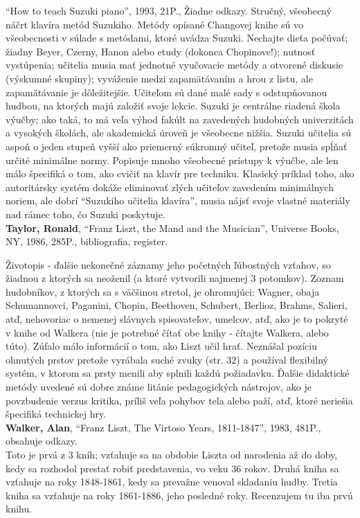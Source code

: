 “How to teach Suzuki piano”, 1993, 21P., Žiadne odkazy. Stručný, všeobecný náčrt klavíra metód Suzukiho. Metódy opísané Changovej knihe sú vo všeobecnosti v súlade s metódami, ktoré uvádza Suzuki. Nechajte dieťa počúvať; žiadny Beyer, Czerny, Hanon alebo etudy (dokonca Chopinove!); nutnosť vystúpenia; učitelia musia mať jednotné vyučovacie metódy a otvorené diskusie (výskumné skupiny); vyváženie medzi zapamätávaním a hrou z listu, ale zapamätávanie je dôležitejšie. Učiteľom sú dané malé sady s odstupňovanou hudbou, na ktorých majú založiť svoje lekcie. Suzuki je centrálne riadená škola výučby; ako taká, to má veľa výhod fakúlt na zavedených hudobných univerzitách a vysokých školách, ale akademická úroveň je všeobecne nižšia. Suzuki učitelia sú aspoň o jeden stupeň vyšší ako priemerný súkromný učiteľ, pretože musia spĺňať určité minimálne normy. Popisuje mnoho všeobecné prístupy k výučbe, ale len málo špecifiká o tom, ako cvičiť na klavír pre techniku. Klasický príklad toho, ako autoritársky systém dokáže eliminovať zlých učiteľov zavedením minimálnych noriem, ale dobrí “Suzukiho učitelia klavíra”, musia nájsť svoje vlastné materiály nad rámec toho, čo Suzuki poskytuje.
\medskip\\
\textbf{Taylor, Ronald}, “Franz Liszt, the Mand and the Musician”, Universe Books, NY, 1986, 285P., bibliografia, register. 

Životopis - ďalšie nekonečné záznamy jeho početných ľúbostných vzťahov, so žiadnou z ktorých sa neoženil (a ktoré vytvorili najmenej 3 potomkov). Zoznam hudobníkov, z ktorých sa s väčšinou stretol, je ohromujúci: Wagner, obaja Schumannovci, Paganini, Chopin, Beethoven, Schubert, Berlioz, Brahms, Salieri, atď, nehovoriac o nemenej slávnych spisovateľov, umelcov, atď, ako je to pokryté v knihe od  Walkera (nie je potrebné čítať obe knihy - čítajte Walkera, alebo túto). Zúfalo málo informácií o tom, ako Liszt učil hrať. Neznášal pozíciu ohnutých prstov pretože vyrábala suché zvuky (str. 32) a používal flexibilný systém, v ktorom sa prsty menili aby splnili každú požiadavku. Ďalšie didaktické metódy uvedené sú dobre známe litánie pedagogických nástrojov, ako je povzbudenie verzus kritika, príliš veľa pohybov tela alebo paží, atď, ktoré neriešia špecifiká technickej hry. 
\medskip\\
\textbf{Walker, Alan}, “Franz Liszt, The Virtoso Years, 1811-1847”, 1983, 481P., obsahuje odkazy.\\
Toto je prvá z 3 kníh; vzťahuje sa na obdobie Liszta od narodenia až do doby, kedy sa rozhodol prestať  robiť predstavenia, vo veku 36 rokov. Druhá kniha sa vzťahuje na roky 1848-1861, kedy sa prevažne venoval skladaniu hudby. Tretia kniha sa vzťahuje na roky 1861-1886, jeho posledné roky. Recenzujem tu iba prvú knihu. 

